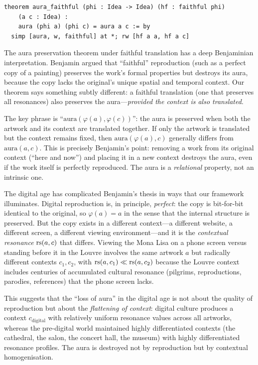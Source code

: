 \begin{lstlisting}
theorem aura_faithful (phi : Idea -> Idea) (hf : faithful phi)
    (a c : Idea) :
    aura (phi a) (phi c) = aura a c := by
  simp [aura, w, faithful] at *; rw [hf a a, hf a c]
\end{lstlisting}

\begin{interpretation}
\label{int:aura-benjamin}
The aura preservation theorem under faithful translation has a deep
Benjaminian interpretation.  Benjamin argued that ``faithful'' reproduction
(such as a perfect copy of a painting) preserves the work's formal
properties but destroys its aura, because the copy lacks the original's
unique spatial and temporal context.  Our theorem says something subtly
different: a faithful translation (one that preserves all resonances)
also preserves the aura---\emph{provided the context is also translated}.

The key phrase is ``$\mathrm{aura}(\varphi(a), \varphi(c))$'': the aura
is preserved when both the artwork and its context are translated together.
If only the artwork is translated but the context remains fixed, then
$\mathrm{aura}(\varphi(a), c)$ generally differs from $\mathrm{aura}(a, c)$.
This is precisely Benjamin's point: removing a work from its original
context (``here and now'') and placing it in a new context destroys the
aura, even if the work itself is perfectly reproduced.  The aura is a
\emph{relational} property, not an intrinsic one.
\end{interpretation}

\begin{remark}
\label{rem:digital-aura}
The digital age has complicated Benjamin's thesis in ways that our framework illuminates.  Digital reproduction is, in principle, \emph{perfect}: the copy is bit-for-bit identical to the original, so $\varphi(a) = a$ in the sense that the internal structure is preserved.  But the copy exists in a different context---a different website, a different screen, a different viewing environment---and it is the \emph{contextual resonance} $\mathrm{rs}(a, c)$ that differs.  Viewing the Mona Lisa on a phone screen versus standing before it in the Louvre involves the same artwork $a$ but radically different contexts $c_1, c_2$, with $\mathrm{rs}(a, c_1) \ll \mathrm{rs}(a, c_2)$ because the Louvre context includes centuries of accumulated cultural resonance (pilgrims, reproductions, parodies, references) that the phone screen lacks.

This suggests that the ``loss of aura'' in the digital age is not about the quality of reproduction but about the \emph{flattening of context}: digital culture produces a context $c_{\mathrm{digital}}$ with relatively uniform resonance values across all artworks, whereas the pre-digital world maintained highly differentiated contexts (the cathedral, the salon, the concert hall, the museum) with highly differentiated resonance profiles.  The aura is destroyed not by reproduction but by contextual homogenisation.
\end{remark}

